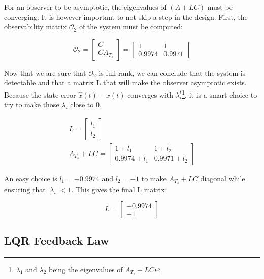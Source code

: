 For an observer to be asymptotic, the eigenvalues of $(A + LC)$ must be converging. It is however important to not skip
a step in the design. First, the observability matrix $\mathcal{O}_2$ of the system must be computed:

\begin{equation}
    \mathcal{O}_2 = 
    \begin{bmatrix}
        C\\
        C A_{T_s}
    \end{bmatrix}
    =
    \begin{bmatrix}
        1 & 1\\
        0.9974 & 0.9971
    \end{bmatrix}
\end{equation}

Now that we are sure that $\mathcal{O}_2$ is full rank, we can conclude that the system is detectable and that a matrix
L that will make the observer asymptotic exists. Because the state error $\hat{x}(t) - x(t)$ converges with 
$\lambda_i^t$\footnote{$\lambda_1$ and $\lambda_2$ being the eigenvalues of $A_{T_s} + LC$}, it is a smart choice to try to make
those $\lambda_i$ close to 0.

\begin{gather}
    L = \begin{bmatrix} l_1\\l_2 \end{bmatrix}\\
    A_{T_s} + L C = \begin{bmatrix} 1+l_1 & 1+l_2 \\ 0.9974+l_1 & 0.9971+l_2 \end{bmatrix}
\end{gather}

An easy choice is $l_1 = -0.9974$ and $l_2 = -1$ to make $A_{T_s} + LC$ diagonal while ensuring that $\left|\lambda_i
\right| < 1$. This gives the final L matrix:

\begin{equation}
    L = \begin{bmatrix}
        -0.9974 \\ -1
    \end{bmatrix}
\end{equation}
\fi

\subsection{LQR Feedback Law}

